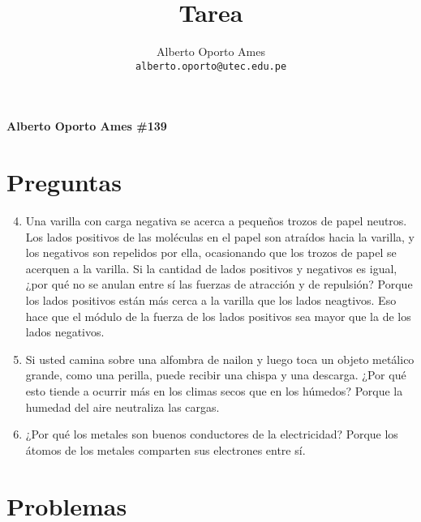 \documentclass[12pt, twoside]{article}
\title{\textbf{Tarea}}
\author{
		Alberto Oporto Ames\\
		\texttt{alberto.oporto@utec.edu.pe}\\
		}
\begin{document}
\textbf{Alberto Oporto Ames \#139}
\thispagestyle{fancy}

\section{Preguntas}%
\label{sec:Preguntas}

\begin{enumerate}
	\setcounter{enumi}{3}
	\item Una varilla con carga negativa se acerca a pequeños trozos de papel neutros.
		Los lados positivos de las moléculas en el papel son atraídos hacia la varilla,
		y los negativos son repelidos por ella,
		ocasionando que los trozos de papel se acerquen a la varilla.
		Si la cantidad de lados positivos y negativos es igual,
		¿por qué no se anulan entre sí las fuerzas de atracción y de repulsión?
		\subitem Porque los lados positivos están más cerca a la varilla que los lados
			neagtivos.
			Eso hace que el módulo de la fuerza de los lados positivos sea mayor
			que la de los lados negativos.

	\item Si usted camina sobre una alfombra de nailon y luego toca un objeto metálico grande,
		como una perilla, puede recibir una chispa y una descarga.
		¿Por qué esto tiende a ocurrir más en los climas secos que en los húmedos?
		\subitem Porque la humedad del aire neutraliza las cargas.

	\item ¿Por qué los metales son buenos conductores de la electricidad?
		\subitem Porque los átomos de los metales comparten sus electrones entre sí.
\end{enumerate}
\section{Problemas}%
\label{sec:Problemas}
\end{document}
